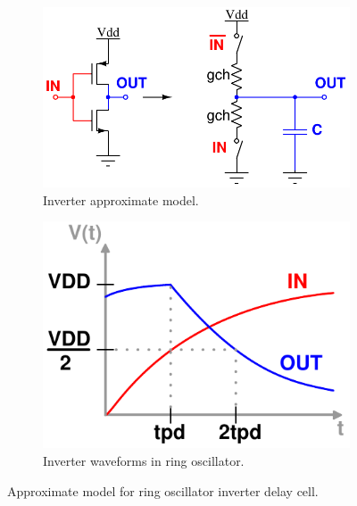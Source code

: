 		\begin{figure}[htb!]
	        \centering
	        \begin{subfigure}{.5\textwidth}
	            \centering
	            \includegraphics[width=\linewidth]{figs/inv_rc_model.pdf}
	            \caption{Inverter approximate model.}
	            \label{fig:rosc_3stg_cir}
	        \end{subfigure}%
	        \begin{subfigure}{.5\textwidth}
	            \centering
	            \includegraphics[width=0.8\linewidth]{figs/inv_waves2.pdf}
	            \caption{Inverter waveforms in ring oscillator.}
	            \label{fig:rosc_3stg_wave}
	        \end{subfigure}
	        \caption{Approximate model for ring oscillator inverter delay cell.}
	        \label{fig:rosc_3stg}
	    \end{figure}

